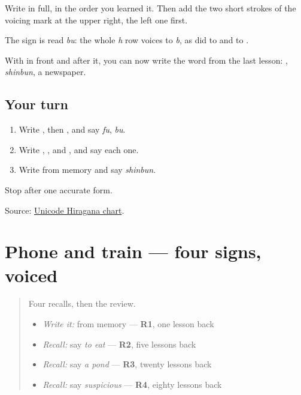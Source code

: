 Write \textbf{} in full, in the order you learned it. Then add the two short strokes of the voicing mark at the upper right, the left one first.

The sign is read \emph{bu}: the whole \emph{h} row voices to \emph{b}, as \textbf{} did to \textbf{} and \textbf{} to \textbf{}.

With \textbf{} in front and \textbf{} after it, you can now write the word from the last lesson: \textbf{}, \emph{shinbun}, a newspaper.

\subsection*{Your turn}
\begin{enumerate}
\raggedright
  \item Write \textbf{}, then \textbf{}, and say \emph{fu}, \emph{bu}.
  \item Write \textbf{}, \textbf{}, \textbf{} and \textbf{}, and say each one.
  \item Write \textbf{} from memory and say \emph{shinbun}.
\end{enumerate}

\begin{tcolorbox}[breakable,colback=teal!4,colframe=teal!35!black,title={Before you move on}]
Stop after one accurate form.

Source: \href{https://www.unicode.org/charts/PDF/U3040.pdf}{Unicode Hiragana chart}.
\end{tcolorbox}
\section[(dialogue)]{Phone and train — four signs, voiced}

\label{lesson:JA-R134-phone-and-train}



\begin{quote}
Four recalls, then the review.

\begin{itemize}
\raggedright
  \item \emph{Write it:} \textbf{} from memory — \textbf{R1}, one lesson back
  \item \emph{Recall:} say \emph{to eat} — \textbf{R2}, five lessons back
  \item \emph{Recall:} say \emph{a pond} — \textbf{R3}, twenty lessons back
  \item \emph{Recall:} say \emph{suspicious} — \textbf{R4}, eighty lessons back
\end{itemize}
\end{quote}

